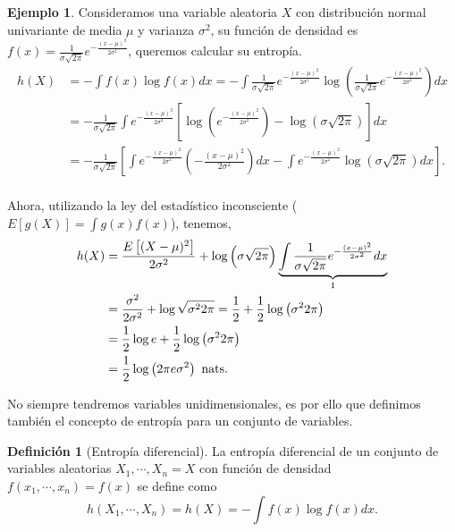 \documentclass[10pt,a4paper]{article} %
\let\mathbb\relax
\theoremstyle{definition}
\newtheorem{definition}{Definición}[section]
\newtheorem{example}[theorem]{Ejemplo}
\begin{document}
\begin{example}\label{ej:norm_uni}
  Consideramos una variable aleatoria $X$ con distribución normal univariante de media $\mu$ y varianza $\sigma^2$, su función de densidad es $f(x) = \frac{1}{\sigma \sqrt{2\pi}} e ^{-\frac{(x-\mu)^2}{2\sigma ^2}}$, queremos calcular su entropía.
  \begin{align*}
    h(X) &= - \int f(x) \log f(x) dx = - \int \frac{1}{\sigma \sqrt{2\pi}} e ^{-\frac{(x-\mu)^2}{2\sigma ^2}} \log \left ( \frac{1}{\sigma \sqrt{2\pi}} e ^{-\frac{(x-\mu)^2}{2\sigma ^2}} \right ) dx\\
    &= -  \frac{1}{\sigma \sqrt{2\pi}} \int e ^{-\frac{(x-\mu)^2}{2\sigma ^2}} \left [ \log \left ( e ^{-\frac{(x-\mu)^2}{2\sigma ^2}} \right ) - \log \left(\sigma \sqrt{2\pi}\right ) \right ] dx\\
    &= -  \frac{1}{\sigma \sqrt{2\pi}}\left [ \int e ^{-\frac{(x-\mu)^2}{2\sigma ^2}} \left ( -\frac{(x-\mu)^2}{2\sigma ^2} \right )dx - \int e ^{-\frac{(x-\mu)^2}{2\sigma ^2}} \log \left ( \sigma \sqrt{2\pi}\right ) dx \right ].\\
  \end{align*}

  Ahora, utilizando la ley del estadístico inconsciente ($E[g(X)]=  \int g(x)f(x)$), tenemos,
  \begin{align*}
    h(X) &= \frac{\mathbb{E}\left [ (X-\mu) ^2\right ] }{2\sigma^2} + \log\left( \sigma\sqrt{2\pi} \right )\underbrace{\int \frac{1}{\sigma\sqrt{2\pi}}e ^{-\frac{(x-\mu)^2}{2\sigma ^2}}dx}_{1}\\
    &= \frac{\sigma^2}{2\sigma^2} + \log \sqrt{\sigma^2 2 \pi} = \frac{1}{2} + \frac{1}{2}\log\left(  \sigma^2 2 \pi\right)\\
    &= \frac{1}{2} \log e + \frac{1}{2} \log\left( \sigma^2 2 \pi\right)\\ &= \frac{1}{2}\log\left({2\pi e\sigma^2} \right) \text{ nats.}
  \end{align*}
  
\end{example}

No siempre tendremos variables unidimensionales, es por ello que definimos también el concepto de entropía para un conjunto de variables.

\begin{definition}[Entropía diferencial]
  La entropía diferencial de un conjunto de variables aleatorias $X_1,\cdots,X_n = X$ con función de densidad $f(x_1,\cdots,x_n) = f(x)$ se define como\[
h(X_1,\cdots,X_n) = h(X) = - \int f(x)\log f(x) dx.
  \]
\end{definition}
\end{document}
